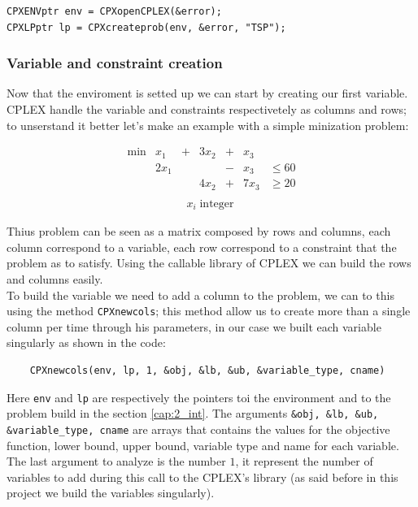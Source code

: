 \begin{lstlisting}
CPXENVptr env = CPXopenCPLEX(&error);
CPXLPptr lp = CPXcreateprob(env, &error, "TSP");
\end{lstlisting}

\subsubsection{Variable and constraint creation}
Now that the enviroment is setted up we can start by creating our first variable. CPLEX handle the variable and constraints respectivetely as columns and rows; to unserstand it better let's make an example with a simple minization problem:

\[ \begin{array}{lllllll}%
	\text{min}  &x_1 	&+ 	& 3x_2 &+ & x_3\\
	  			&  2x_1 &  	&   &- &x_3 &\le 60\\
	  			&		&	& 4x_2 & + &7x_3 &\ge 20\\
\end{array}\]%
\begin{align*}
x_i \; \text{integer}\
\end{align*}

Thius problem can be seen as a matrix composed by rows and columns, each column correspond to a variable, each row correspond to a constraint that the problem as to satisfy. Using the callable library of CPLEX we can build the rows and columns easily.\\
To build the variable we need to add a column to the problem, we can to this using the method \verb|CPXnewcols|; this method allow us to create more than a single column per time through his parameters, in our case we built each variable singularly as shown in the code:

\begin{lstlisting}
	CPXnewcols(env, lp, 1, &obj, &lb, &ub, &variable_type, cname)
\end{lstlisting}

Here \verb|env| and \verb|lp| are respectively the  pointers toi the environment and to the problem build in the section \ref{cap:2_int}.
The arguments \verb|&obj, &lb, &ub, &variable_type, cname| are arrays that contains the values for the objective function, lower bound, upper bound, variable type and name for each variable. The last argument to analyze is the number $1$, it represent the number of variables to add during this call to the CPLEX's library (as said before in this project we build the variables singularly).

